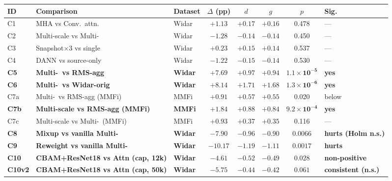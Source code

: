 \documentclass[11pt]{article}
\theoremstyle{definition}
\newcommand{\MDE}{\text{MDE}}
\newcommand{\Rx}{\text{Rx}}
\begin{document}
\begin{table}[!t]
    \label{tab:main}
    \scriptsize
    \setlength{\tabcolsep}{2pt}
    \begin{tabular}{@{}l >{\raggedright\arraybackslash}p{3.6cm} l c c c c >{\raggedright\arraybackslash}p{1.5cm}@{}}
    \toprule
    ID & Comparison & Dataset & $\Delta$ (pp) & $d$ & $g$ & $p$ & Sig. \\
    \midrule
    C1 & MHA vs Conv.\ attn.               & Widar & $+1.13$   & $+0.17$ & $+0.16$ & 0.478 & ---  \\
    C2 & Multi-scale vs Multi-\Rx          & Widar & $-1.28$   & $-0.14$ & $-0.14$ & 0.450 & ---  \\
    C3 & Snapshot$\times$3 vs single       & Widar & $+0.23$   & $+0.15$ & $+0.14$ & 0.537 & ---  \\
    C4 & DANN vs source-only               & Widar & $-1.22$   & $-0.15$ & $-0.14$ & 0.530 & ---  \\
    \textbf{C5} & \textbf{Multi-\Rx\ vs RMS-agg} & \textbf{Widar} & $\mathbf{+7.69}$ & $\mathbf{+0.97}$ & $\mathbf{+0.94}$ & $\mathbf{1.1\!\times\!10^{-5}}$ & \textbf{yes} \\
    \textbf{C6} & \textbf{Multi-\Rx\ vs Widar-orig} & \textbf{Widar} & $\mathbf{+8.14}$ & $\mathbf{+1.71}$ & $\mathbf{+1.68}$ & $\mathbf{1.3\!\times\!10^{-6}}$ & \textbf{yes} \\
    C7a & Multi-\Rx\ vs RMS-agg (MMFi)     & MMFi & $+0.91$   & $+0.57$ & $+0.55$ & 0.020 & below \MDE \\
    \textbf{C7b} & \textbf{Multi-scale vs RMS-agg (MMFi)} & \textbf{MMFi} & $\mathbf{+1.84}$ & $\mathbf{+0.88}$ & $\mathbf{+0.84}$ & $\mathbf{9.2\!\times\!10^{-4}}$ & \textbf{yes} \\
    C7c & Multi-scale vs Multi-\Rx\ (MMFi)     & MMFi & $+0.93$   & $+0.37$ & $+0.35$ & 0.116 & --- \\
    \textbf{C8} & \textbf{Mixup vs vanilla Multi-\Rx} & \textbf{Widar} & $\mathbf{-7.90}$ & $\mathbf{-0.96}$ & $\mathbf{-0.90}$ & $\mathbf{0.0066}$ & \textbf{hurts (Holm n.s.)} \\
    \textbf{C9} & \textbf{Reweight vs vanilla Multi-\Rx} & \textbf{Widar} & $\mathbf{-10.17}$ & $\mathbf{-1.19}$ & $\mathbf{-1.11}$ & $\mathbf{0.0017}$ & \textbf{hurts} \\
    \textbf{C10} & \textbf{CBAM+ResNet18 vs Attn (cap, 12k)} & \textbf{Widar} & $\mathbf{-4.61}$ & $\mathbf{-0.52}$ & $\mathbf{-0.49}$ & $\mathbf{0.028}$ & \textbf{non-positive} \\
    \textbf{C10v2} & \textbf{CBAM+ResNet18 vs Attn (cap, 50k)} & \textbf{Widar} & $\mathbf{-5.75}$ & $\mathbf{-0.44}$ & $\mathbf{-0.42}$ & $\mathbf{0.061}$ & \textbf{consistent (n.s.)} \\

\end{tabular}
\end{table}
\end{document}

